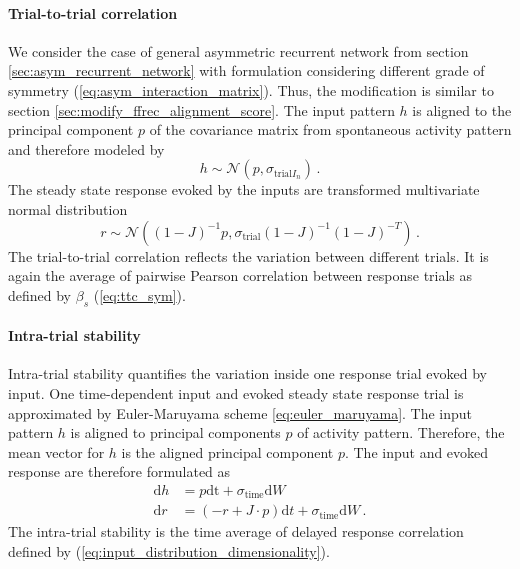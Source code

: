 \documentclass[11pt]{article}
\begin{document}
	\paragraph{Trial-to-trial correlation} We consider the case of general asymmetric recurrent network from section \ref{sec:asym_recurrent_network} with formulation considering different grade of symmetry (\ref{eq:asym_interaction_matrix}). Thus, the modification is similar to section \ref{sec:modify_ffrec_alignment_score}. The input pattern $h$ is aligned to the principal component $p$ of the covariance matrix from spontaneous activity pattern and therefore modeled by
		\begin{equation}
			h \sim \mathcal{N}(p, \sigma_{\text{trial}I_n}) \, .
		\end{equation}
	The steady state response evoked by the inputs are transformed multivariate normal distribution
		\begin{equation}
			r \sim \mathcal{N}\left((1-J)^{-1}p, \sigma_{\text{trial}} (1-J)^{-1} (1-J)^{-T}\right) \, .
		\end{equation}
	The trial-to-trial correlation reflects the variation between different trials. It is again the average of pairwise Pearson correlation between response trials as defined by $\beta_s$ (\ref{eq:ttc_sym}). 
	
	\paragraph{Intra-trial stability} Intra-trial stability quantifies the variation inside one response trial evoked by input. One time-dependent input and evoked steady state response trial is approximated by Euler-Maruyama scheme \ref{eq:euler_maruyama}. The input pattern $h$ is aligned to principal components $p$ of activity pattern. Therefore, the mean vector for $h$ is the aligned principal component $p$. The input and evoked response are therefore formulated as
		\begin{subequations}
			\begin{align}
				\mathrm{d} h & = p \mathrm{dt} + \sigma_{\text{time}} \mathrm{d} W \\
				\mathrm{d} r & = (-r + J \cdot p) \mathrm{d}t + \sigma_{\text{time}} \mathrm{d} W \, .
			\end{align}
		\end{subequations}
	The intra-trial stability is the time average of delayed response correlation defined by (\ref{eq:input_distribution_dimensionality}). 
	
\end{document}
